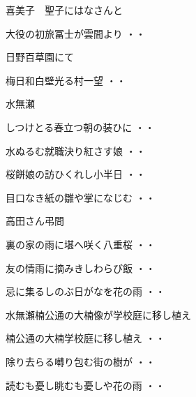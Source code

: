 喜美子　聖子にはなさんと
\begin{shiika}大役の初旅冨士が雲間より
\hfill{・・}\end{shiika}
\vspace{0.6cm}
日野百草園にて
\begin{shiika}梅日和白壁光る村一望
\hfill{・・}\end{shiika}
\vspace{0.6cm}
水無瀬
\begin{shiika}しつけとる春立つ朝の装ひに
\hfill{・・}\end{shiika}
\begin{shiika}水ぬるむ就職決り紅さす娘
\hfill{・・}\end{shiika}
\begin{shiika}桜餅娘の訪ひくれし小半日
\hfill{・・}\end{shiika}
\begin{shiika}目口なき紙の雛や掌になじむ
\hfill{・・}\end{shiika}
\vspace{0.6cm}
高田さん弔問
\begin{shiika}裏の家の雨に堪へ咲く八重桜
\hfill{・・}\end{shiika}
\begin{shiika}友の情雨に摘みきしわらび飯
\hfill{・・}\end{shiika}
\begin{shiika}忌に集るしのぶ日がなを花の雨
\hfill{・・}\end{shiika}
\vspace{0.6cm}
水無瀬楠公通の大楠像が学校庭に移し植え
\begin{shiika}楠公通の大楠学校庭に移し植え
\hfill{・・}\end{shiika}
\vspace{0.6cm}
\begin{shiika}除り去らる囀り包む街の樹が
\hfill{・・}\end{shiika}
\begin{shiika}読むも憂し眺むも憂しや花の雨
\hfill{・・}\end{shiika}
